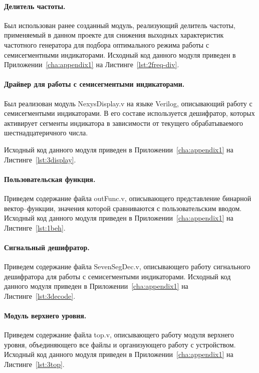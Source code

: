 \paragraph{Делитель частоты.}
Был использован ранее созданный модуль, реализующий делитель частоты, применяемый в данном проекте для снижения выходных характеристик частотного генератора для подбора оптимального режима работы с семисегментными индикаторами.
Исходный код данного модуля приведен в Приложении~\ref{cha:appendix1} на Листинге~\ref{lst:2freq-div}.


\paragraph{Драйвер для работы с семисегментыми индикаторами.}
Был реализован модуль NexysDisplay.v на языке Verilog, описывающий работу с семисегментыми индикаторами. В его составе используется дешифратор, которых активирует сегменты индикатора в зависимости от текущего обрабатываемого шестнадцатеричного числа.

 Исходный код данного модуля приведен в Приложении~\ref{cha:appendix1} на Листинге~\ref{lst:3display}.

\paragraph{Пользовательская функция.}
Приведем содержание файла outFunc.v, описывающего представление бинарной вектор--функции, значения которой сравниваются с пользовательским вводом. 
Исходный код данного модуля приведен в Приложении~\ref{cha:appendix1} на Листинге~\ref{lst:1beh}.

\paragraph{Сигнальный дешифратор.}
Приведем содержание файла SevenSegDec.v, описывающего работу сигнального дешифратора для работы с семисегментыми индикаторами.
Исходный код данного модуля приведен в Приложении~\ref{cha:appendix1} на Листинге~\ref{lst:3decode}.

\paragraph{Модуль верхнего уровня.}
Приведем содержание файла top.v, описывающего работу модуля верхнего уровня, объединяющего все файлы и организующего работу с устройством.
Исходный код данного модуля приведен в Приложении~\ref{cha:appendix1} на Листинге~\ref{lst:3top}.


